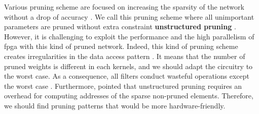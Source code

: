 Various pruning scheme are focused on increasing the sparsity of the network without a drop of accuracy \cite{han_learning_2015, han_deep_2016}.  We call this pruning scheme where all unimportant parameters are pruned without extra constraint \textbf{unstructured pruning} \cite{cheng_recent_2018}. However, it is challenging to exploit the performance and the high parallelism of \acrshort{fpga} with this kind of pruned network. Indeed, this kind of pruning scheme creates irregularities in the data access pattern \cite{zhu_efficient_2020}. It means that the number of pruned weights is different in each kernels, and we should adapt the circuitry to the worst case. As a consequence, all filters conduct wasteful operations except the worst case \cite{shimoda_filter-wise_2019}. Furthermore, \textcite{anwar_structured_2017} pointed that unstructured pruning requires an overhead for computing addresses of the sparse non-pruned elements. Therefore, we should find pruning patterns that would be more hardware-friendly.

